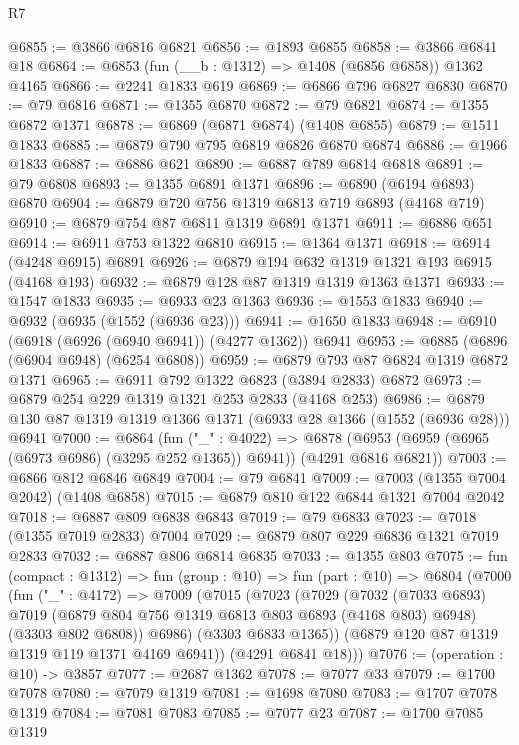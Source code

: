 \begin{lexlean}{R7}
\begin{coremodule}
@6855 := @3866 @6816 @6821
@6856 := @1893 @6855
@6858 := @3866 @6841 @18
@6864 := @6853 (fun (__b : @1312) => @1408 (@6856 @6858)) @1362 @4165
@6866 := @2241 @1833 @619
@6869 := @6866 @796 @6827 @6830
@6870 := @79 @6816
@6871 := @1355 @6870
@6872 := @79 @6821
@6874 := @1355 @6872 @1371
@6878 := @6869 (@6871 @6874) (@1408 @6855)
@6879 := @1511 @1833
@6885 := @6879 @790 @795 @6819 @6826 @6870 @6874
@6886 := @1966 @1833
@6887 := @6886 @621
@6890 := @6887 @789 @6814 @6818
@6891 := @79 @6808
@6893 := @1355 @6891 @1371
@6896 := @6890 (@6194 @6893) @6870
@6904 := @6879 @720 @756 @1319 @6813 @719 @6893 (@4168 @719)
@6910 := @6879 @754 @87 @6811 @1319 @6891 @1371
@6911 := @6886 @651
@6914 := @6911 @753 @1322 @6810
@6915 := @1364 @1371
@6918 := @6914 (@4248 @6915) @6891
@6926 := @6879 @194 @632 @1319 @1321 @193 @6915 (@4168 @193)
@6932 := @6879 @128 @87 @1319 @1319 @1363 @1371
@6933 := @1547 @1833
@6935 := @6933 @23 @1363
@6936 := @1553 @1833
@6940 := @6932 (@6935 (@1552 (@6936 @23)))
@6941 := @1650 @1833
@6948 := @6910 (@6918 (@6926 (@6940 @6941)) (@4277 @1362)) @6941
@6953 := @6885 (@6896 (@6904 @6948) (@6254 @6808))
@6959 := @6879 @793 @87 @6824 @1319 @6872 @1371
@6965 := @6911 @792 @1322 @6823 (@3894 @2833) @6872
@6973 := @6879 @254 @229 @1319 @1321 @253 @2833 (@4168 @253)
@6986 := @6879 @130 @87 @1319 @1319 @1366 @1371 (@6933 @28 @1366 (@1552 (@6936 @28))) @6941
@7000 := @6864
    (fun ("_" : @4022) =>
    @6878 (@6953 (@6959 (@6965 (@6973 @6986) (@3295 @252 @1365)) @6941)) (@4291 @6816 @6821))
@7003 := @6866 @812 @6846 @6849
@7004 := @79 @6841
@7009 := @7003 (@1355 @7004 @2042) (@1408 @6858)
@7015 := @6879 @810 @122 @6844 @1321 @7004 @2042
@7018 := @6887 @809 @6838 @6843
@7019 := @79 @6833
@7023 := @7018 (@1355 @7019 @2833) @7004
@7029 := @6879 @807 @229 @6836 @1321 @7019 @2833
@7032 := @6887 @806 @6814 @6835
@7033 := @1355 @803
@7075 := fun (compact : @1312) =>
  fun (group : @10) =>
  fun (part : @10) =>
  @6804
    (@7000
      (fun ("_" : @4172) =>
      @7009
        (@7015
          (@7023
            (@7029
              (@7032
                (@7033 @6893)
                @7019
                (@6879 @804 @756 @1319 @6813 @803 @6893 (@4168 @803) @6948)
                (@3303 @802 @6808))
              @6986)
            (@3303 @6833 @1365))
          (@6879 @120 @87 @1319 @1319 @119 @1371 @4169 @6941))
        (@4291 @6841 @18)))
@7076 := (operation : @10) -> @3857
@7077 := @2687 @1362
@7078 := @7077 @33
@7079 := @1700 @7078
@7080 := @7079 @1319
@7081 := @1698 @7080
@7083 := @1707 @7078 @1319
@7084 := @7081 @7083
@7085 := @7077 @23
@7087 := @1700 @7085 @1319

\end{coremodule}
\end{lexlean}
